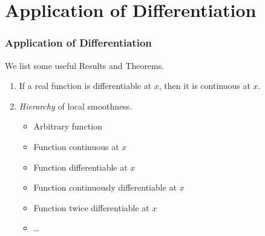 \documentclass[12pt, t]{beamer}
\renewcommand{\emph}[1]{{\color{Turquoise3}\textsl{#1}}}
\begin{document}
\section{Application of Differentiation}
\begin{frame}
    \frametitle{Application of Differentiation}
    We list some useful Results and Theorems.
    \begin{enumerate}
        \item If a real function is differentiable at $x$, then it is continuous at $x$.
              \vspace{0.5em}
        \item \emph{Hierarchy} of local smoothness.
              \begin{itemize}
                  \item Arbitrary function
                  \item Function continuous at $x$
                  \item Function differentiable at $x$
                  \item Function continuously differentiable at $x$
                  \item Function twice differentiable at $x$
                  \item \dots
              \end{itemize}
    \end{enumerate}


\end{frame}
\end{document}

